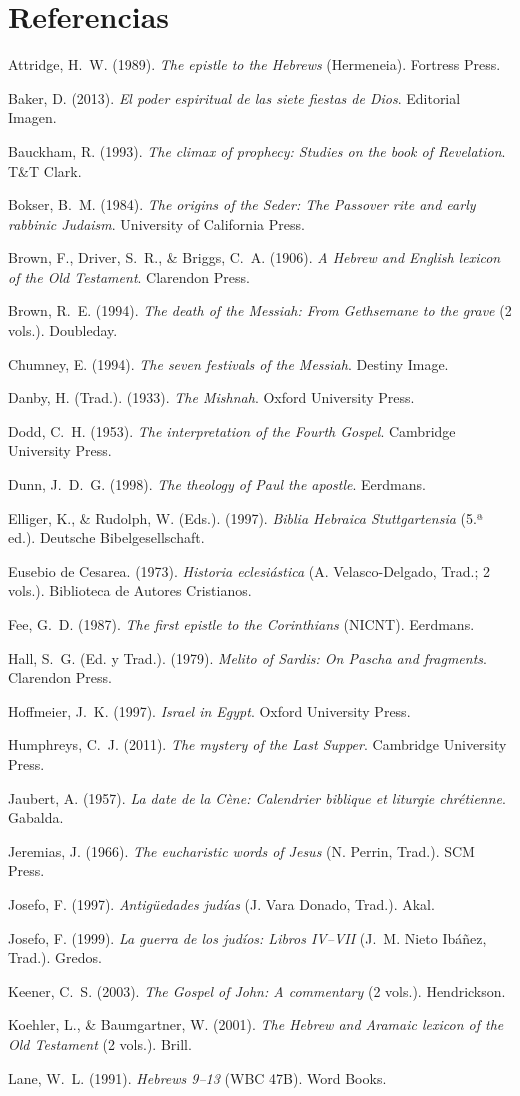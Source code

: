 \documentclass[11pt,letterpaper]{article}
\newcommand{\refapa}[1]{\par{\RaggedRight\hangindent=1.27cm\hangafter=1\noindent #1\par}\vspace{4pt}}
\begin{document}
\section*{Referencias}
\refapa{Attridge, H.~W. (1989). \emph{The epistle to the Hebrews} (Hermeneia). Fortress Press.}
\refapa{Baker, D. (2013). \emph{El poder espiritual de las siete fiestas de Dios}. Editorial Imagen.}
\refapa{Bauckham, R. (1993). \emph{The climax of prophecy: Studies on the book of Revelation}. T\&T Clark.}
\refapa{Bokser, B.~M. (1984). \emph{The origins of the Seder: The Passover rite and early rabbinic Judaism}. University of California Press.}
\refapa{Brown, F., Driver, S.~R., \& Briggs, C.~A. (1906). \emph{A Hebrew and English lexicon of the Old Testament}. Clarendon Press.}
\refapa{Brown, R.~E. (1994). \emph{The death of the Messiah: From Gethsemane to the grave} (2 vols.). Doubleday.}
\refapa{Chumney, E. (1994). \emph{The seven festivals of the Messiah}. Destiny Image.}
\refapa{Danby, H. (Trad.). (1933). \emph{The Mishnah}. Oxford University Press.}
\refapa{Dodd, C.~H. (1953). \emph{The interpretation of the Fourth Gospel}. Cambridge University Press.}
\refapa{Dunn, J.~D.~G. (1998). \emph{The theology of Paul the apostle}. Eerdmans.}
\refapa{Elliger, K., \& Rudolph, W. (Eds.). (1997). \emph{Biblia Hebraica Stuttgartensia} (5.ª ed.). Deutsche Bibelgesellschaft.}
\refapa{Eusebio de Cesarea. (1973). \emph{Historia eclesiástica} (A. Velasco-Delgado, Trad.; 2 vols.). Biblioteca de Autores Cristianos.}
\refapa{Fee, G.~D. (1987). \emph{The first epistle to the Corinthians} (NICNT). Eerdmans.}
\refapa{Hall, S.~G. (Ed. y Trad.). (1979). \emph{Melito of Sardis: On Pascha and fragments}. Clarendon Press.}
\refapa{Hoffmeier, J.~K. (1997). \emph{Israel in Egypt}. Oxford University Press.}
\refapa{Humphreys, C.~J. (2011). \emph{The mystery of the Last Supper}. Cambridge University Press.}
\refapa{Jaubert, A. (1957). \emph{La date de la Cène: Calendrier biblique et liturgie chrétienne}. Gabalda.}
\refapa{Jeremias, J. (1966). \emph{The eucharistic words of Jesus} (N. Perrin, Trad.). SCM Press.}
\refapa{Josefo, F. (1997). \emph{Antigüedades judías} (J. Vara Donado, Trad.). Akal.}
\refapa{Josefo, F. (1999). \emph{La guerra de los judíos: Libros IV--VII} (J.~M. Nieto Ibáñez, Trad.). Gredos.}
\refapa{Keener, C.~S. (2003). \emph{The Gospel of John: A commentary} (2 vols.). Hendrickson.}
\refapa{Koehler, L., \& Baumgartner, W. (2001). \emph{The Hebrew and Aramaic lexicon of the Old Testament} (2 vols.). Brill.}
\refapa{Lane, W.~L. (1991). \emph{Hebrews 9--13} (WBC 47B). Word Books.}
\end{document}
